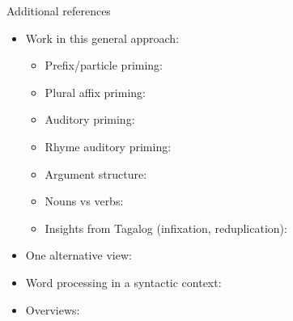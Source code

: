 

\begin{frame}{Additional references}
	\begin{itemize}
		\item Work in this general approach:
			\begin{itemize}
			\item Prefix/particle priming: \cite{creemersetal20jml}
			\item Plural affix priming: \cite{goodwindaviesembick19}
			\item Auditory priming: \cite{schluter13,ussishkinetal15}
			\item Rhyme auditory priming: \cite{bacovcinetal17}
			\item Argument structure: \cite{gwilliamsmarantz18,neophytouetal18}
			\item Nouns vs verbs: \cite{kingetal14}
            \item Insights from Tagalog (infixation, reduplication): \cite{wrayetal22,cayado23phd,cayadoetal23}
			\end{itemize}
		\item One alternative view: \cite{baayenetal11,baayenetal15lcn,marantz13lcp}
		\item Word processing in a syntactic context: \cite{lukechristianson11}
		\item Overviews: \cite{crepaldi23taf,stockallgwilliams20cup}
	\end{itemize}
\end{frame}


